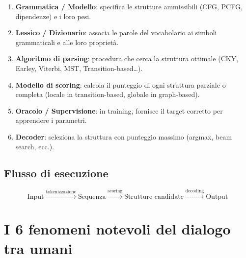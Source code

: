 \documentclass[12pt,a4paper]{article}
\begin{document}
\begin{defbox}
\begin{enumerate}[leftmargin=1.5em, label=\arabic*.]
  \item \textbf{Grammatica / Modello}: specifica le strutture ammissibili (CFG, PCFG, dipendenze) e i loro pesi.
  \item \textbf{Lessico / Dizionario}: associa le parole del vocabolario ai simboli grammaticali e alle loro proprietà.
  \item \textbf{Algoritmo di parsing}: procedura che cerca la struttura ottimale (CKY, Earley, Viterbi, MST, Transition-based\dots).
  \item \textbf{Modello di scoring}: calcola il punteggio di ogni struttura parziale o completa (locale in transition-based, globale in graph-based).
  \item \textbf{Oracolo / Supervisione}: in training, fornisce il target corretto per apprendere i parametri.
  \item \textbf{Decoder}: seleziona la struttura con punteggio massimo (argmax, beam search, ecc.).
\end{enumerate}
\end{defbox}

\subsection{Flusso di esecuzione}
\[
\text{Input} \xrightarrow{\text{tokenizzazione}} \text{Sequenza} \xrightarrow{\text{scoring}} \text{Strutture candidate} \xrightarrow{\text{decoding}} \text{Output}
\]

\section{I 6 fenomeni notevoli del dialogo tra umani}
\end{document}
